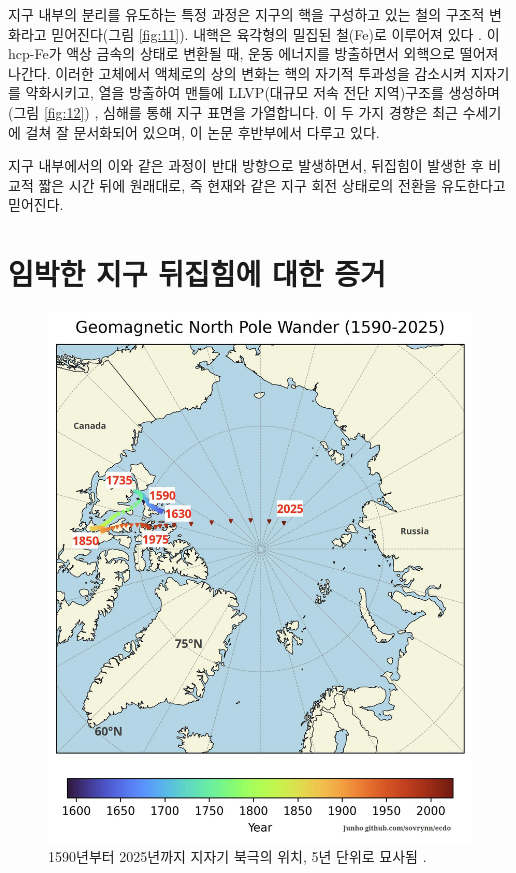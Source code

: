 \documentclass[10pt,twocolumn,letterpaper]{article}
\begin{document}
지구 내부의 분리를 유도하는 특정 과정은 지구의 핵을 구성하고 있는 철의 구조적 변화라고 믿어진다(그림 \ref{fig:11}). 내핵은 육각형의 밀집된 철(Fe)로 이루어져 있다 \cite{141}. 이 hcp-Fe가 액상 금속의  상태로 변환될 때,  운동 에너지를 방출하면서 외핵으로 떨어져 나간다. 이러한 고체에서 액체로의 상의 변화는 핵의 자기적 투과성을 감소시켜 지자기를 약화시키고, 열을 방출하여 맨틀에 LLVP(대규모 저속 전단 지역)구조를 생성하며(그림 \ref{fig:12}) \cite{38}, 심해를 통해 지구 표면을 가열합니다. 이 두 가지 경향은 최근 수세기에 걸쳐 잘 문서화되어 있으며, 이 논문 후반부에서 다루고 있다.

지구 내부에서의 이와 같은 과정이 반대 방향으로 발생하면서, 뒤집힘이 발생한 후 비교적 짧은 시간 뒤에 원래대로, 즉 현재와 같은 지구 회전 상태로의 전환을 유도한다고 믿어진다.

\section{임박한 지구 뒤집힘에 대한 증거}

\begin{figure}[t]
\begin{center}
   \includegraphics[width=1\linewidth]{npw.jpg}
\end{center}
   \caption{1590년부터 2025년까지 지자기 북극의 위치, 5년 단위로 묘사됨 \cite{142}.}
\label{fig:13}
\label{fig:onecol}
\end{figure}
\end{document}
